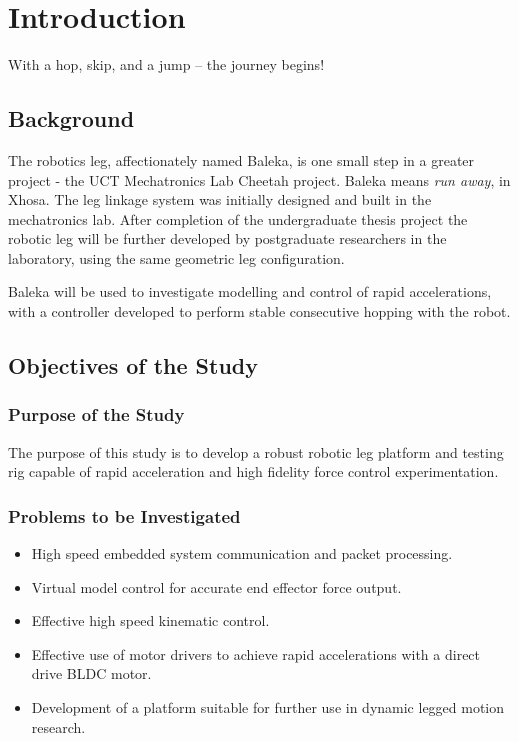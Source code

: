 \chapter{Introduction}
\label{chap:intro}

With a hop, skip, and a jump -- the journey begins!

\section{Background}

The robotics leg, affectionately named Baleka, is one small step in a greater project - the UCT Mechatronics Lab Cheetah project. Baleka means \textit{run away}, in Xhosa. The leg linkage system was initially designed and built in the mechatronics lab. After completion of the undergraduate thesis project the robotic leg will be further developed by postgraduate researchers in the laboratory, using the same geometric leg configuration. 

Baleka will be used to investigate modelling and control of rapid accelerations, with a controller developed to perform stable consecutive hopping with the robot.

\section{Objectives of the Study}
\subsection{Purpose of the Study}
The purpose of this study is to develop a robust robotic leg platform and testing rig capable of rapid acceleration and high fidelity force control experimentation.

\subsection{Problems to be Investigated}
\begin{itemize}
\item High speed embedded system communication and packet processing.
\item Virtual model control for accurate end effector force output. 
\item Effective high speed kinematic control.
\item Effective use of motor drivers to achieve rapid accelerations with a direct drive BLDC motor.
\item Development of a platform suitable for further use in dynamic legged motion research.
\end{itemize}

